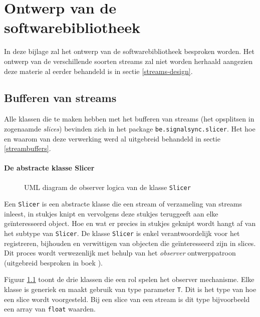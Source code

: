 \chapter{Ontwerp van de softwarebibliotheek}
\label{appendix-b}

In deze bijlage zal het ontwerp van de softwarebibliotheek besproken worden. Het ontwerp van de verschillende soorten streams zal niet worden herhaald aangezien deze materie al eerder behandeld is in sectie \ref{streams-design}.

\section*{Bufferen van streams}

Alle klassen die te maken hebben met het bufferen van streams (het opsplitsen in zogenaamde \textit{slices}) bevinden zich in het package \texttt{be.signalsync.slicer}. Het hoe en waarom van deze verwerking werd al uitgebreid behandeld in sectie \ref{streambuffers}.

\subsubsection{De abstracte klasse Slicer}

\begin{figure}[h!]
	\captionsetup{width=0.7\textwidth}
	\caption{UML diagram de observer logica van de klasse \texttt{Slicer}}
	\begin{center}
		\advance\parskip0.3cm
		
	\end{center}
	\label{slicerObserver}
\end{figure}

Een \texttt{Slicer} is een abstracte klasse die een stream of verzameling van streams inleest, in stukjes knipt en vervolgens deze stukjes teruggeeft aan elke geïnteresseerd object. Hoe en wat er precies in stukjes geknipt wordt hangt af van het subtype van \texttt{Slicer}. De klasse \texttt{Slicer} is enkel verantwoordelijk voor het registreren, bijhouden en verwittigen van objecten die geïnteresseerd zijn in slices. Dit proces wordt verwezenlijk met behulp van het \textit{observer} ontwerppatroon (uitgebreid besproken in boek \cite{vlissides1995design}). 

Figuur \ref{slicerObserver} toont de drie klassen die een rol spelen het observer mechanisme. Elke klasse is generiek en maakt gebruik van type parameter \texttt{T}. Dit is het type van hoe een slice wordt voorgesteld. Bij een slice van een stream is dit type bijvoorbeeld een array van \texttt{float} waarden.


